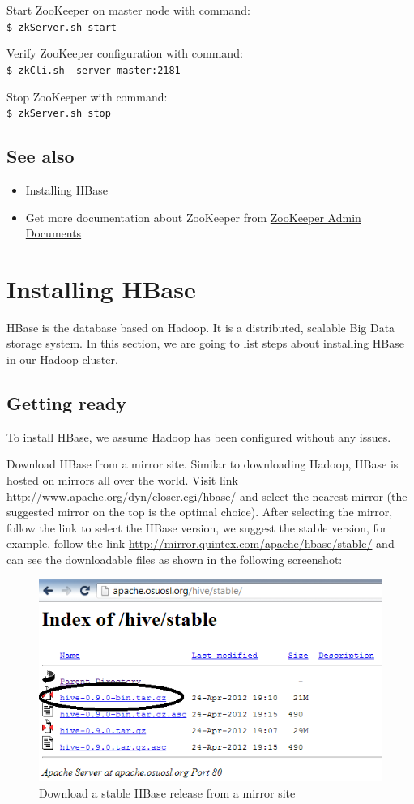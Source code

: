 Start ZooKeeper on master node with command: \\
\verb|$ zkServer.sh start|

Verify ZooKeeper configuration with command: \\
\verb|$ zkCli.sh -server master:2181|

Stop ZooKeeper with command: \\
\verb|$ zkServer.sh stop|

\subsection*{See also}
\begin{itemize}
  \item Installing HBase
  \item Get more documentation about ZooKeeper from \href{http://zookeeper.apache.org/doc/r3.4.5/zookeeperAdmin.html}{ZooKeeper Admin Documents}
\end{itemize}

\section{Installing HBase}
HBase is the database based on Hadoop. It is a distributed, scalable Big Data storage system. In this section, we are going to list steps about installing HBase in our Hadoop cluster.

\subsection*{Getting ready}
To install HBase, we assume Hadoop has been configured without any issues.

Download HBase from a mirror site. Similar to downloading Hadoop, HBase is hosted on mirrors all over the world. Visit link \url{http://www.apache.org/dyn/closer.cgi/hbase/} and select the nearest mirror (the suggested mirror on the top is the optimal choice).  After selecting the mirror, follow the link to select the HBase version, we suggest the stable version, for example, follow the link \url{http://mirror.quintex.com/apache/hbase/stable/} and can see the downloadable files as shown in the following screenshot:
\begin{figure}[h]
  \centering
  \includegraphics[width=.6\textwidth]{figs/5163os_03_08.png}
  \caption{Download a stable HBase release from a mirror site}\label{fig:hbase.download}
\end{figure} 

